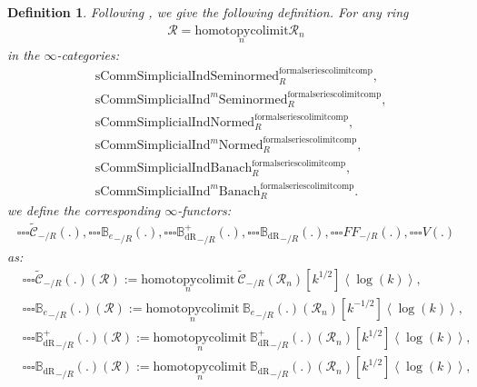 \documentclass[12pt]{book}
\newtheorem{definition}{Definition}
\begin{document}
\begin{definition}
Following \cite[Definition 9.3.3, Definition 9.3.5, Definition 9.3.11, Definition 9.3.9]{KL1}, \cite{KL2} we give the following definition. For any ring
\begin{align}
\mathcal{R}=\underset{n}{\mathrm{homotopycolimit}}\mathcal{R}_n	
\end{align}
in the $\infty$-categories:
\begin{align}
&\mathrm{sComm}\mathrm{Simplicial}\mathrm{Ind}\mathrm{Seminormed}^\mathrm{formalseriescolimitcomp}_R,\\
&\mathrm{sComm}\mathrm{Simplicial}\mathrm{Ind}^m\mathrm{Seminormed}^\mathrm{formalseriescolimitcomp}_R,\\
&\mathrm{sComm}\mathrm{Simplicial}\mathrm{Ind}\mathrm{Normed}^\mathrm{formalseriescolimitcomp}_R,\\
&\mathrm{sComm}\mathrm{Simplicial}\mathrm{Ind}^m\mathrm{Normed}^\mathrm{formalseriescolimitcomp}_R,\\
&\mathrm{sComm}\mathrm{Simplicial}\mathrm{Ind}\mathrm{Banach}^\mathrm{formalseriescolimitcomp}_R,\\
&\mathrm{sComm}\mathrm{Simplicial}\mathrm{Ind}^m\mathrm{Banach}^\mathrm{formalseriescolimitcomp}_R.	
\end{align}	
we define the corresponding $\infty$-functors:
\begin{align}
{\square\square\square}\widetilde{\mathcal{C}}_{-/R}(.),{\square\square\square}{\mathbb{B}_e}_{-/R}(.),{\square\square\square}{\mathbb{B}_\mathrm{dR}^+}_{-/R}(.),{\square\square\square}{\mathbb{B}_\mathrm{dR}}_{-/R}(.),{\square\square\square}{FF}_{-/R}(.),{\square\square\square}V(.)	
\end{align}
as:
\begin{align}
&{\square\square\square}\widetilde{\mathcal{C}}_{-/R}(.)(\mathcal{R}):=\underset{n}{\mathrm{homotopycolimit}}~\widetilde{\mathcal{C}}_{-/R}(\mathcal{R}_n)[k^{1/2}]\left<\log(k)\right>,\\
&{\square\square\square}{\mathbb{B}_e}_{-/R}(.)(\mathcal{R}):=\underset{n}{\mathrm{homotopycolimit}}~{\mathbb{B}_e}_{-/R}(.)(\mathcal{R}_n)[k^{-1/2}]\left<\log(k)\right>,\\
&{\square\square\square}{\mathbb{B}_\mathrm{dR}^+}_{-/R}(.)(\mathcal{R}):=\underset{n}{\mathrm{homotopycolimit}}~{\mathbb{B}_\mathrm{dR}^+}_{-/R}(.)(\mathcal{R}_n)[k^{1/2}]\left<\log(k)\right>,\\
&{\square\square\square}{\mathbb{B}_\mathrm{dR}}_{-/R}(.)(\mathcal{R}):=\underset{n}{\mathrm{homotopycolimit}}~{\mathbb{B}_\mathrm{dR}}_{-/R}(.)(\mathcal{R}_n)[k^{1/2}]\left<\log(k)\right>,\\

\end{align}
\end{definition}
\end{document}
